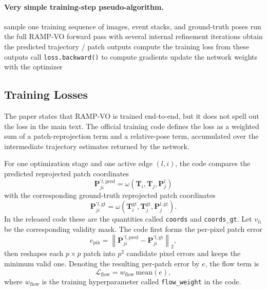 \documentclass[11pt]{article}
\newcommand{\norm}[1]{\left\lVert #1 \right\rVert}
\begin{document}
\paragraph{Very simple training-step pseudo-algorithm.}
\begin{algorithm}[h]
\caption{One RAMP-VO Training Step}
\begin{algorithmic}[1]
\State sample one training sequence of images, event stacks, and ground-truth poses
\State run the full RAMP-VO forward pass with several internal refinement iterations
\State obtain the predicted trajectory / patch outputs
\State compute the training loss from these outputs
\State call \texttt{loss.backward()} to compute gradients
\State update the network weights with the optimizer
\end{algorithmic}
\end{algorithm}

\subsection{Training Losses}

The paper states that RAMP-VO is trained end-to-end, but it does not spell out the loss in the main text. The official training code defines the loss as a weighted sum of a patch-reprojection term and a relative-pose term, accumulated over the intermediate trajectory estimates returned by the network.

For one optimization stage and one active edge \((l,i)\), the code compares the predicted reprojected patch coordinates
\begin{equation}
\mathbf{P}_{ji}^{\prime l,\mathrm{pred}} = \omega(\mathbf{T}_i,\mathbf{T}_j,\mathbf{P}_j^l)
\end{equation}
with the corresponding ground-truth reprojected patch coordinates
\begin{equation}
\mathbf{P}_{ji}^{\prime l,\mathrm{gt}} = \omega(\mathbf{T}_i^{\mathrm{gt}},\mathbf{T}_j^{\mathrm{gt}},\mathbf{P}_j^{l,\mathrm{gt}}).
\end{equation}
In the released code these are the quantities called \texttt{coords} and \texttt{coords\_gt}. Let \(v_{li}\) be the corresponding validity mask. The code first forms the per-pixel patch error
\begin{equation}
e_{\mathrm{pix}} = \norm{\mathbf{P}_{ji}^{\prime l,\mathrm{pred}}-\mathbf{P}_{ji}^{\prime l,\mathrm{gt}}}_2,
\end{equation}
then reshapes each \(p\times p\) patch into \(p^2\) candidate pixel errors and keeps the minimum valid one. Denoting the resulting per-patch error by \(e\), the flow term is
\begin{equation}
\mathcal{L}_{\mathrm{flow}} = w_{\mathrm{flow}}\,\mathrm{mean}(e),
\end{equation}
where \(w_{\mathrm{flow}}\) is the training hyperparameter called \texttt{flow\_weight} in the code.
\end{document}
